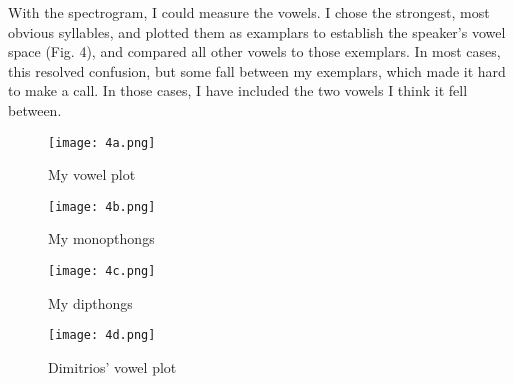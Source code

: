 \documentclass[doc,12pt]{apa6}
\begin{document}
With the spectrogram, I could measure the vowels. I chose the strongest, most
obvious syllables, and plotted them as examplars to establish the speaker's
vowel space (Fig. 4), and compared all other vowels to those exemplars. In most
cases, this resolved confusion, but some fall between my exemplars, which made
it hard to make a call. In those cases, I have included the two vowels I think
it fell between.

\begin{exe}
	\ex {}
\end{exe}

\begin{figure}
	\texttt{[image: 4a.png]}
	\caption{My vowel plot}
\end{figure}

\begin{figure}
	\texttt{[image: 4b.png]}
	\caption{My monopthongs}
\end{figure}

\begin{figure}
	\texttt{[image: 4c.png]}
	\caption{My dipthongs}
\end{figure}

\begin{figure}
	\texttt{[image: 4d.png]}
	\caption{Dimitrios' vowel plot}
\end{figure}
\end{document}
